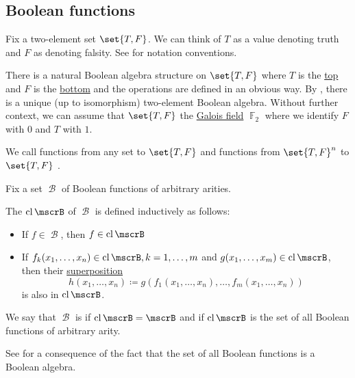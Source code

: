 \subsection{Boolean functions}\label{subsec:boolean_functions}

\begin{definition}\label{def:boolean_value}
  Fix a two-element set \( \set{ T, F } \). We can think of \( T \) as a value denoting truth and \( F \) as denoting falsity. See  for notation conventions.

  There is a natural Boolean algebra structure on \( \set{ T, F } \) where \( T \) is the \hyperref[def:samilattice/join]{top} and \( F \) is the \hyperref[def:samilattice/meet]{bottom} and the operations are defined in an obvious way. By , there is a unique (up to isomorphism) two-element Boolean algebra. Without further context, we can assume that \( \set{ T, F } \) the \hyperref[thm:galois_field_existence]{Galois field} \( \BbbF_2 \) where we identify \( F \) with \( 0 \) and \( T \) with \( 1 \).
\end{definition}

\begin{definition}\label{def:boolean_function}
  We call functions from any set to \( \set{ T, F } \)  and functions from \( \set{ T, F }^n \) to \( \set{ T, F } \) .
\end{definition}

\begin{definition}\label{def:boolean_closure}
  Fix a set \( \mscrB \) of Boolean functions of arbitrary arities.

  The  \( \cl{\mscrB} \) of \( \mscrB \) is defined inductively as follows:
  \begin{itemize}
    \item If \( f \in \mscrB \), then \( f \in \cl{\mscrB} \)
    \item If \( f_k(x_1, \ldots, x_n) \in \cl{\mscrB}, k = 1, \ldots, m \) and \( g(x_1, \ldots, x_m) \in \cl{\mscrB} \), then their \hyperref[def:function/superposition]{superposition}
    \begin{equation*}
      h(x_1, \ldots, x_n) \coloneqq g(f_1(x_1, \ldots, x_n), \ldots, f_m(x_1, \ldots, x_n))
    \end{equation*}
    is also in \( \cl{\mscrB} \).
  \end{itemize}

  We say that \( \mscrB \) is  if \( \cl{\mscrB} = \mscrB \) and  if \( \cl{\mscrB} \) is the set of all Boolean functions of arbitrary arity.

  See  for a consequence of the fact that the set of all Boolean functions is a Boolean algebra.
\end{definition}

